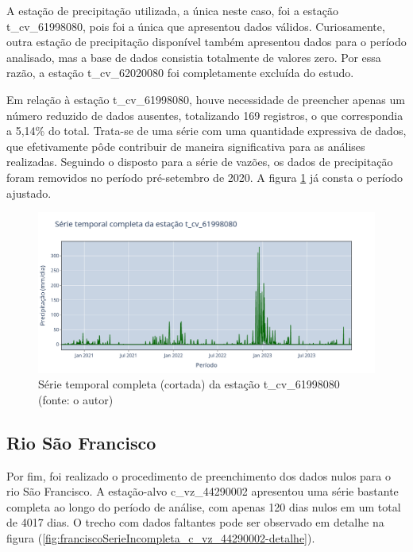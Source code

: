 A estação de precipitação utilizada, a única neste caso, foi a estação t\_cv\_61998080, pois foi a única que apresentou dados válidos. Curiosamente, outra estação de precipitação disponível também apresentou dados para o período analisado, mas a base de dados consistia totalmente de valores zero. Por essa razão, a estação t\_cv\_62020080 foi completamente excluída do estudo.

Em relação à estação t\_cv\_61998080, houve necessidade de preencher apenas um número reduzido de dados ausentes, totalizando 169 registros, o que correspondia a 5,14\% do total. Trata-se de uma série com uma quantidade expressiva de dados, que efetivamente pôde contribuir de maneira significativa para as análises realizadas. Seguindo o disposto para a série de vazões, os dados de precipitação foram removidos no período pré-setembro de 2020. A figura \ref{fig:serie_completa_estacao_t_cv_61998080} já consta o período ajustado.

\begin{figure}[!h]
	\centering
	\includegraphics[scale=0.25]{Figuras/rio_grande/serie_completa_estacao_t_cv_61998080.png}
	\caption{Série temporal completa (cortada) da estação t\_cv\_61998080\\(fonte: o autor)}
	\label{fig:serie_completa_estacao_t_cv_61998080}
\end{figure}
\clearpage

\subsection{Rio São Francisco}

Por fim, foi realizado o procedimento de preenchimento dos dados nulos para o rio São Francisco. A estação-alvo c\_vz\_44290002 apresentou uma série bastante completa ao longo do período de análise, com apenas 120 dias nulos em um total de 4017 dias. O trecho com dados faltantes pode ser observado em detalhe na figura (\ref{fig:franciscoSerieIncompleta_c_vz_44290002-detalhe}).

